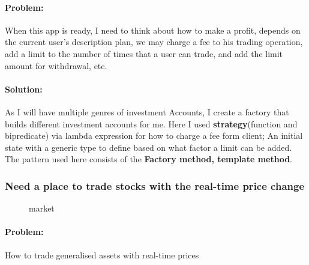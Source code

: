 \documentclass[a4paper,12pt]{report}
\begin{document}
	\paragraph*{Problem:} When this app is ready, I need to think about how to make a profit, depends on the current user's description plan, we may charge a fee to his trading operation, add a limit to the number of times that a user can trade, and add the limit amount for withdrawal, etc. 

	\paragraph*{Solution:} As I will have multiple genres of investment Accounts, I create a factory that builds different investment accounts for me. Here I used \textbf{strategy}(function and bipredicate) via lambda expression for how to charge a fee form client;
	An initial state with a generic type to define based on what factor a limit can be added. The pattern used here consists of the \textbf{Factory method, template method}. 


\subsubsection*{Need a place to trade stocks with the real-time price change}
	\begin{figure}[H]
	\centering{}
	\caption{market}
	\label{img:market}
	\end{figure}

	\paragraph{Problem:} How to trade generalised assets with real-time prices
\end{document}
